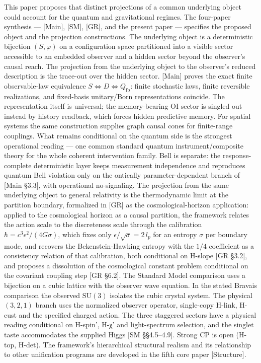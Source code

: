 \documentclass[
]{article}
\begin{document}
This paper proposes that distinct projections of a common underlying
object could account for the quantum and gravitational regimes. The
four-paper synthesis --- {[}Main{]}, {[}SM{]}, {[}GR{]}, and the present
paper --- specifies the proposed object and the projection
constructions. The underlying object is a deterministic bijection
\((S, \varphi)\) on a configuration space partitioned into a visible
sector accessible to an embedded observer and a hidden sector beyond the
observer's causal reach. The projection from the underlying object to
the observer's reduced description is the trace-out over the hidden
sector. {[}Main{]} proves the exact finite observable-law equivalence
\(S\iff D\iff Q_{\mathrm{fb}}\): finite stochastic laws, finite
reversible realizations, and fixed-basis unitary/Born representations
coincide. The representation itself is universal; the memory-bearing OI
sector is singled out instead by history readback, which forces hidden
predictive memory. For spatial systems the same construction supplies
graph causal cones for finite-range couplings. What remains conditional
on the quantum side is the strongest operational reading --- one common
standard quantum instrument/composite theory for the whole coherent
intervention family. Bell is separate: the response-complete
deterministic layer keeps measurement independence and reproduces
quantum Bell violation only on the ontically parameter-dependent branch
of {[}Main §3.3{]}, with operational no-signaling. The projection from
the same underlying object to general relativity is the thermodynamic
limit at the partition boundary, formalized in {[}GR{]} as the
cosmological-horizon application: applied to the cosmological horizon as
a causal partition, the framework relates the action scale to the
discreteness scale through the calibration
\(\hbar = c^3 \epsilon^2 / (4G\sigma)\), which fixes only
\(\epsilon/\sqrt{\sigma} = 2\,l_p\) for an entropy \(\sigma\) per
boundary mode, and recovers the Bekenstein-Hawking entropy with the
\(1/4\) coefficient as a consistency relation of that calibration, both
conditional on H-slope {[}GR §3.2{]}, and proposes a dissolution of the
cosmological constant problem conditional on the covariant coupling step
{[}GR §6.2{]}. The Standard Model comparison uses a bijection on a cubic
lattice with the observer wave equation. In the stated Bravais
comparison the observed \(\mathrm{SU}(3)\) isolates the cubic crystal
system. The physical \((3,2,1)\) branch uses the normalized observer
operator, single-copy H-link, H-cust and the specified charged action.
The three staggered sectors have a physical reading conditional on
H-spin', H-χ' and light-spectrum selection, and the singlet taste
accommodates the supplied Higgs {[}SM §§4.5--4.9{]}. Strong CP is open
(H-top, H-det). The framework's hierarchical structural realism and its
relationship to other unification programs are developed in the fifth
core paper {[}Structure{]}.
\end{document}
